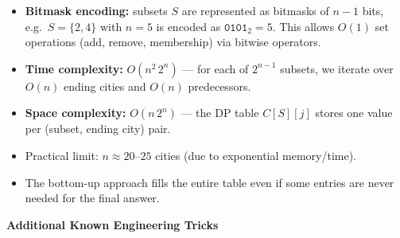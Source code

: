 \documentclass[11pt]{article}
\providecommand{\tightlist}{%
      \setlength{\itemsep}{0pt}\setlength{\parskip}{0pt}}
\begin{document}
\begin{itemize}
\tightlist
\item
  \textbf{Bitmask encoding:} subsets \(S\) are represented as bitmasks
  of \(n{-}1\) bits, e.g.~\(S = \{2,4\}\) with \(n=5\) is encoded as
  \(\texttt{0101}_2 = 5\). This allows \(O(1)\) set operations (add,
  remove, membership) via bitwise operators.
\item
  \textbf{Time complexity:} \(O(n^2\, 2^n)\) --- for each of \(2^{n-1}\)
  subsets, we iterate over \(O(n)\) ending cities and \(O(n)\)
  predecessors.
\item
  \textbf{Space complexity:} \(O(n\, 2^n)\) --- the DP table \(C[S][j]\)
  stores one value per (subset, ending city) pair.
\item
  Practical limit: \(n \approx 20\text{–}25\) cities (due to exponential
  memory/time).
\item
  The bottom-up approach fills the entire table even if some entries are
  never needed for the final answer.
\end{itemize}

    \label{tricks-1-3}

    \textbf{Additional Known Engineering Tricks}
\end{document}
